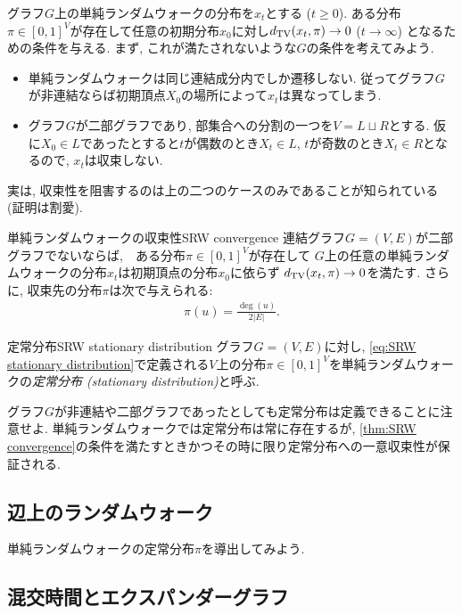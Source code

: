グラフ$G$上の単純ランダムウォークの分布を$x_t$とする ($t\ge 0$).
ある分布$\pi\in[0,1]^V$が存在して任意の初期分布$x_0$に対し$d_{\mathrm{TV}}(x_t,\pi) \to 0$ ($t \to \infty$) となるための条件を与える.
まず, これが満たされないような$G$の条件を考えてみよう.
\begin{itemize}
  \item 単純ランダムウォークは同じ連結成分内でしか遷移しない. 従ってグラフ$G$が非連結ならば初期頂点$X_0$の場所によって$x_t$は異なってしまう.
  \item グラフ$G$が二部グラフであり, 部集合への分割の一つを$V=L\sqcup R$とする. 仮に$X_0\in L$であったとすると$t$が偶数のとき$X_t \in L$, $t$が奇数のとき$X_t \in R$となるので, $x_t$は収束しない.
\end{itemize}
%
実は, 収束性を阻害するのは上の二つのケースのみであることが知られている (証明は割愛).
%
\begin{theorem}{単純ランダムウォークの収束性}{SRW convergence}
  連結グラフ$G=(V,E)$が二部グラフでないならば,　ある分布$\pi\in[0,1]^V$が存在して
  $G$上の任意の単純ランダムウォークの分布$x_t$は初期頂点の分布$x_0$に依らず
  $d_{\mathrm{TV}}(x_t,\pi) \to 0$を満たす.
  さらに, 収束先の分布$\pi$は次で与えられる:
  \begin{align}
    \pi(u) = \frac{\deg(u)}{2|E|}. \label{eq:SRW stationary distribution}
  \end{align}
\end{theorem}
%
\begin{definition}{定常分布}{SRW stationary distribution}
  グラフ$G=(V,E)$に対し, \cref{eq:SRW stationary distribution}で定義される$V$上の分布$\pi\in[0,1]^V$を単純ランダムウォークの\emph{定常分布 (stationary distribution)}と呼ぶ.
\end{definition}
グラフ$G$が非連結や二部グラフであったとしても定常分布は定義できることに注意せよ.
単純ランダムウォークでは定常分布は常に存在するが,
\cref{thm:SRW convergence}の条件を満たすときかつその時に限り定常分布への一意収束性が保証される.

\subsection{辺上のランダムウォーク}
単純ランダムウォークの定常分布$\pi$を導出してみよう.


\subsection{混交時間とエクスパンダーグラフ}